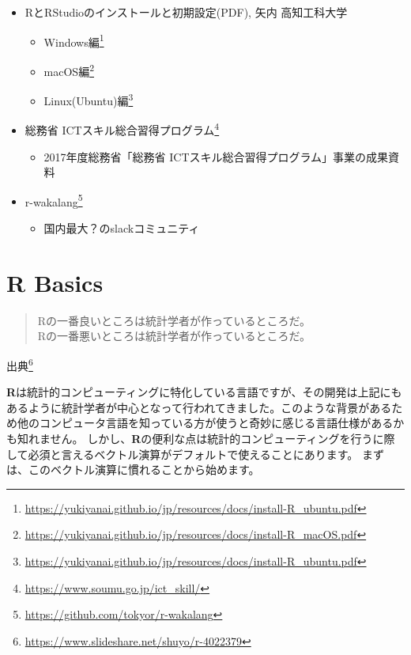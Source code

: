 \documentclass[
  12pt,
]{book}
\DeclareRobustCommand{\href}[2]{#2\footnote{\url{#1}}}
\providecommand{\tightlist}{%
  \setlength{\itemsep}{0pt}\setlength{\parskip}{0pt}}
\begin{document}
\begin{itemize}
\tightlist
\item
  RとRStudioのインストールと初期設定(PDF), 矢内 高知工科大学

  \begin{itemize}
  \tightlist
  \item
    \href{https://yukiyanai.github.io/jp/resources/docs/install-R_ubuntu.pdf}{Windows編}
  \item
    \href{https://yukiyanai.github.io/jp/resources/docs/install-R_macOS.pdf}{macOS編}
  \item
    \href{https://yukiyanai.github.io/jp/resources/docs/install-R_ubuntu.pdf}{Linux(Ubuntu)編}
  \end{itemize}
\item
  \href{https://www.soumu.go.jp/ict_skill/}{総務省 ICTスキル総合習得プログラム}

  \begin{itemize}
  \tightlist
  \item
    2017年度総務省「総務省 ICTスキル総合習得プログラム」事業の成果資料
  \end{itemize}
\item
  \href{https://github.com/tokyor/r-wakalang}{r-wakalang}

  \begin{itemize}
  \tightlist
  \item
    国内最大？のslackコミュニティ
  \end{itemize}
\end{itemize}

\hypertarget{Appendix-RBasics}{%
\chapter{R Basics}\label{Appendix-RBasics}}

\begin{quote}
Rの一番良いところは統計学者が作っているところだ。\\
Rの一番悪いところは統計学者が作っているところだ。
\end{quote}

\href{https://www.slideshare.net/shuyo/r-4022379}{出典}

\textbf{R}は統計的コンピューティングに特化している言語ですが、その開発は上記にもあるように統計学者が中心となって行われてきました。このような背景があるため他のコンピュータ言語を知っている方が使うと奇妙に感じる言語仕様があるかも知れません。 しかし、\textbf{R}の便利な点は統計的コンピューティングを行うに際して必須と言えるベクトル演算がデフォルトで使えることにあります。 まずは、このベクトル演算に慣れることから始めます。
\end{document}
